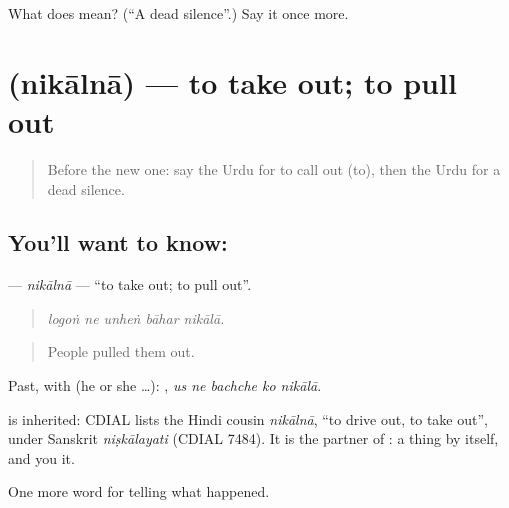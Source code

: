 \begin{tcolorbox}[breakable,colback=teal!4,colframe=teal!35!black,title={Before you move on}]
What does  mean? (\textquotedblleft{}A dead silence\textquotedblright{}.) Say it once more.
\end{tcolorbox}
\section[\texorpdfstring{\ur{نکالنا} (nikālnā)}{نکالنا (nikālnā)}]{ (nikālnā) — to take out; to pull out}

\label{lesson:UR-C295-nikaalna}



\begin{quote}
Before the new one: say the Urdu for to call out (to), then the Urdu for a dead silence.
\end{quote}

\subsection*{You'll want to know: }
\textbf{} — \emph{nikālnā} — \textquotedblleft{}to take out; to pull out\textquotedblright{}.

\begin{quote}
    
\end{quote}

\begin{quote}
\emph{logoṅ ne unheṅ bāhar nikālā.}
\end{quote}

\begin{quote}
People pulled them out.
\end{quote}

Past, with  (he or she …):     , \emph{us ne bachche ko nikālā}.

\begin{cousinweb}
is inherited: CDIAL lists the Hindi cousin \emph{nikālnā}, \textquotedblleft{}to drive out, to take out\textquotedblright{}, under Sanskrit \emph{niṣkālayati} (CDIAL 7484). It is the partner of \textbf{}: a thing \textbf{} by itself, and you \textbf{} it.
\end{cousinweb}

\begin{grammarlens}[title={What you've built}]
One more word for telling what happened.
\end{grammarlens}

